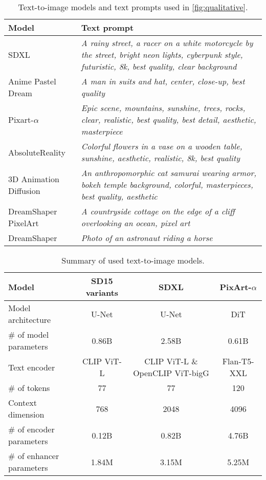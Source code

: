 \begin{table}[t]
\caption{Text-to-image models and text prompts used in \cref{fig:qualitative}.}
\label{tab:quantitative_setting}
\begin{center}
\begin{small}
\begin{tabular}{p{5.5cm}p{10.5cm}}
\toprule
Model & Text prompt \\
\midrule
SDXL~\cite{podell2024sdxl}  & \textit{A rainy street, a racer on a white motorcycle by the street, bright neon lights, cyberpunk style, futuristic, 8k, best quality, clear background} \\
Anime Pastel Dream & \textit{A man in suits and hat, center, close-up, best quality} \\
Pixart-$\alpha$~\cite{chen2024pixart} & \textit{Epic scene, mountains, sunshine, trees, rocks, clear, realistic, best quality, best detail, aesthetic, masterpiece} \\
AbsoluteReality & \textit{Colorful flowers in a vase on a wooden table, sunshine, aesthetic, realistic, 8k, best quality} \\
3D Animation Diffusion & \textit{An anthropomorphic cat samurai wearing armor, bokeh temple background, colorful, masterpieces, best quality, aesthetic} \\
DreamShaper PixelArt & \textit{A countryside cottage on the edge of a cliff overlooking an ocean, pixel art} \\
DreamShaper & \textit{Photo of an astronaut riding a horse} \\
\bottomrule
\end{tabular}
\end{small}
\end{center}
\end{table}


\begin{table}[t]
\caption{Summary of used text-to-image models.}
\label{tab:model_setting}
\begin{center}
\begin{small}
\begin{tabular}{lccc}
\toprule
Model & SD15 variants & SDXL & PixArt-$\alpha$ \\
\midrule
Model architecture          & U-Net & U-Net & DiT   \\
\# of model parameters      & 0.86B & 2.58B & 0.61B \\
Text encoder                & CLIP ViT-L & CLIP ViT-L \& OpenCLIP ViT-bigG & Flan-T5-XXL \\
\# of tokens                & 77    & 77    & 120   \\
Context dimension           & 768   & 2048  & 4096  \\
\# of encoder parameters    & 0.12B & 0.82B & 4.76B \\
\# of enhancer parameters   & 1.84M & 3.15M & 5.25M \\
\bottomrule
\end{tabular}
\end{small}
\end{center}
\end{table}


